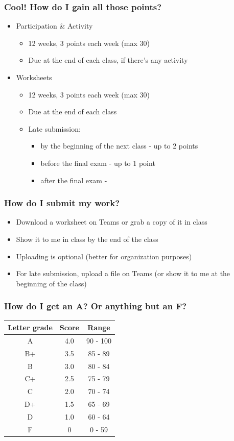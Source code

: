 \begin{frame}
\frametitle{Cool! How do I gain all those points?}

\begin{itemize}
\item Participation \& Activity \faStreetView
\begin{itemize}
\item 12 weeks, 3 points each week (max 30)
\item Due at the end of each class, if there's any activity
\end{itemize}
\item Worksheets
\begin{itemize}
\item 12 weeks, 3 points each week (max 30)
\item Due at the end of each class
\item Late submission:
\begin{itemize}
\item by the beginning of the next class - up to 2 points
\item before the final exam - up to 1 point
\item after the final exam - \faMehO
\end{itemize}
\end{itemize}
\end{itemize}
\end{frame}


\begin{frame}
\frametitle{How do I submit my work?}
\begin{itemize}
\item Download a worksheet on Teams or grab a copy of it in class
\item Show it to me in class by the end of the class
\item Uploading is optional (better for organization purposes)
\item For late submission, upload a file on Teams (or show it to me at the beginning of the class)
\end{itemize}
\end{frame}

\begin{frame}
\frametitle{How do I get an A? Or anything but an F?} 

\begin{table}
\centering
\begin{tabular}{|c|c|c|}
\hline
Letter grade & Score & Range \\
\hline
A & 4.0 & 90 - 100  \\ 
B+ & 3.5 & 85 - 89  \\
B & 3.0 & 80 - 84  \\
C+ & 2.5 & 75 - 79  \\
C & 2.0 & 70 - 74  \\
D+ & 1.5 & 65 - 69  \\
D & 1.0 & 60 - 64  \\
F & 0 & 0 - 59  \\
\hline
\end{tabular}
\end{table}
\end{frame}


